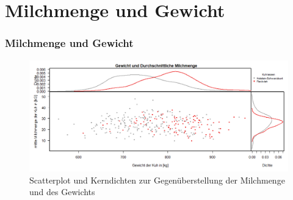 \documentclass{beamer}
\begin{document}
    	\section{Milchmenge und Gewicht}
	\begin{frame}
		\frametitle{Milchmenge und Gewicht}
		\begin{figure}[h]
			\centering
			\includegraphics[width=1\textwidth]{Scatter und Kerndichte Milchmenge~Gewicht.png}
			\vspace{-0.6cm}
			\caption{Scatterplot und Kerndichten zur Gegenüberstellung der Milchmenge und des Gewichts}
		\end{figure}
	\end{frame}
\end{document}
